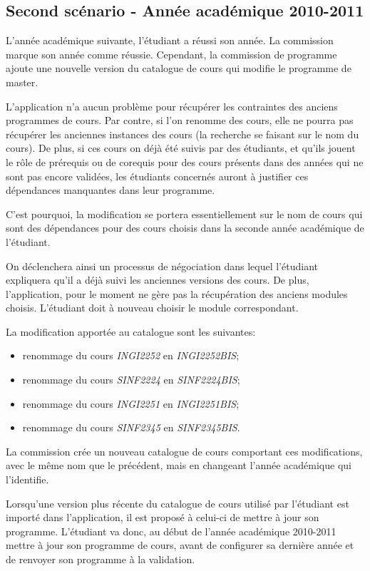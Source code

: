 \subsection{Second scénario - Année académique 2010-2011}
L'année académique suivante, l'étudiant a réussi son année. La commission marque son année comme réussie. Cependant, la commission de programme ajoute une nouvelle version du catalogue de cours qui modifie le programme de master.

L'application n'a aucun problème pour récupérer les contraintes des anciens programmes de cours. Par contre, si l'on renomme des cours, elle ne pourra pas récupérer les anciennes instances des cours (la recherche se faisant sur le nom du cours). De plus, si ces cours on déjà été suivis par des étudiants, et qu'ils jouent le rôle de prérequis ou de corequis pour des cours présents dans des années qui ne sont pas encore validées, les étudiants concernés auront à justifier ces dépendances manquantes dans leur programme. 

C'est pourquoi, la modification se portera essentiellement sur le nom de cours qui sont des dépendances pour des cours choisis dans la seconde année académique de l'étudiant.


On déclenchera ainsi un processus de négociation dans lequel l'étudiant expliquera qu'il a déjà suivi les anciennes versions des cours. De plus, l'application, pour le moment ne gère pas la récupération des anciens modules choisis. L'étudiant doit à nouveau choisir le module correspondant. 

La modification apportée au catalogue sont les suivantes:
\begin{itemize}
\item renommage du cours \textit{INGI2252} en \textit{INGI2252BIS};
\item renommage du cours \textit{SINF2224} en \textit{SINF2224BIS};
\item renommage du cours \textit{INGI2251} en \textit{INGI2251BIS};
\item renommage du cours \textit{SINF2345} en \textit{SINF2345BIS}.
\end{itemize}

La commission crée un nouveau catalogue de cours comportant ces modifications, avec le même nom que le précédent, mais en changeant l'année académique qui l'identifie. 

Lorsqu'une version plus récente du catalogue de cours utilisé par l'étudiant est importé dans l'application, il est proposé à celui-ci de mettre à jour son programme. L'étudiant va donc, au début de l'année académique 2010-2011 mettre à jour son programme de cours, avant de configurer sa dernière année et de renvoyer son programme à la validation.

